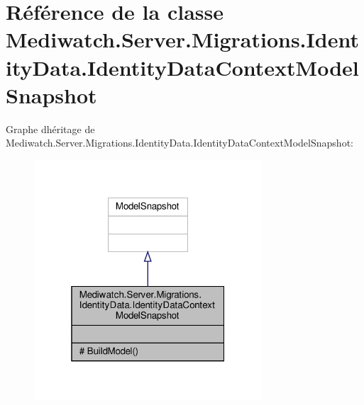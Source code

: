 \hypertarget{class_mediwatch_1_1_server_1_1_migrations_1_1_identity_data_1_1_identity_data_context_model_snapshot}{}\section{Référence de la classe Mediwatch.\+Server.\+Migrations.\+Identity\+Data.\+Identity\+Data\+Context\+Model\+Snapshot}
\label{class_mediwatch_1_1_server_1_1_migrations_1_1_identity_data_1_1_identity_data_context_model_snapshot}


Graphe d\textquotesingle{}héritage de Mediwatch.\+Server.\+Migrations.\+Identity\+Data.\+Identity\+Data\+Context\+Model\+Snapshot\+:
\nopagebreak
\begin{figure}[H]
\begin{center}
\leavevmode
\includegraphics[width=241pt]{class_mediwatch_1_1_server_1_1_migrations_1_1_identity_data_1_1_identity_data_context_model_snapshot__inherit__graph}
\end{center}
\end{figure}


